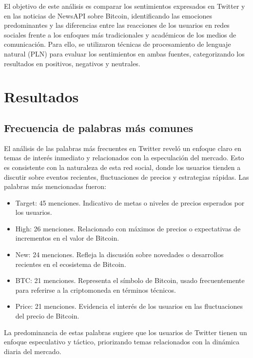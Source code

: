\documentclass[journal]{IEEEtran}
\begin{document}
El objetivo de este análisis es comparar los sentimientos expresados en Twitter y en las noticias de NewsAPI sobre Bitcoin, identificando las emociones predominantes y las diferencias entre las reacciones de los usuarios en redes sociales frente a los enfoques más tradicionales y académicos de los medios de comunicación. Para ello, se utilizaron técnicas de procesamiento de lenguaje natural (PLN) para evaluar los sentimientos en ambas fuentes, categorizando los resultados en positivos, negativos y neutrales.

\section{Resultados}
\subsection{Frecuencia de palabras más comunes}

El análisis de las palabras más frecuentes en Twitter reveló un enfoque claro en temas de interés inmediato y relacionados con la especulación del mercado. Esto es consistente con la naturaleza de esta red social, donde los usuarios tienden a discutir sobre eventos recientes, fluctuaciones de precios y estrategias rápidas. Las palabras más mencionadas fueron:
\begin{itemize}
    \item Target: 45 menciones. Indicativo de metas o niveles de precios esperados por los usuarios.
    \item High: 26 menciones. Relacionado con máximos de precios o expectativas de incrementos en el valor de Bitcoin.
    \item New: 24 menciones. Refleja la discusión sobre novedades o desarrollos recientes en el ecosistema de Bitcoin.
    \item BTC: 21 menciones. Representa el símbolo de Bitcoin, usado frecuentemente para referirse a la criptomoneda en términos técnicos.
    \item Price: 21 menciones. Evidencia el interés de los usuarios en las fluctuaciones del precio de Bitcoin.
\end{itemize}
La predominancia de estas palabras sugiere que los usuarios de Twitter tienen un enfoque especulativo y táctico, priorizando temas relacionados con la dinámica diaria del mercado.
\end{document}

